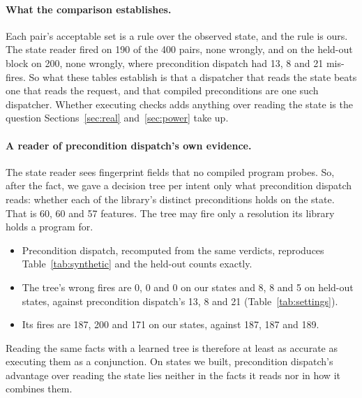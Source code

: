 \documentclass[11pt]{article}
\begin{document}
\paragraph{What the comparison establishes.}
Each pair's acceptable set is a rule over the observed state, and the rule is ours. The state
reader fired on 190 of the 400 pairs, none wrongly, and on the held-out block on 200, none
wrongly, where precondition dispatch had 13, 8 and 21 mis-fires. So what these tables establish
is that a dispatcher that reads the state beats one that reads the request, and that compiled
preconditions are one such dispatcher. Whether executing checks adds anything over reading the
state is the question Sections~\ref{sec:real} and~\ref{sec:power} take up.

\paragraph{A reader of precondition dispatch's own evidence.}
The state reader sees fingerprint fields that no compiled program probes. So, after the fact, we
gave a decision tree per intent only what precondition dispatch reads: whether each of the
library's distinct preconditions holds on the state. That is 60, 60 and 57 features. The tree may
fire only a resolution its library holds a program for.
\begin{itemize}
  \item Precondition dispatch, recomputed from the same verdicts, reproduces Table~\ref{tab:synthetic}
  and the held-out counts exactly.
  \item The tree's wrong fires are 0, 0 and 0 on our states and 8, 8 and 5 on held-out states,
  against precondition dispatch's 13, 8 and 21 (Table~\ref{tab:settings}).
  \item Its fires are 187, 200 and 171 on our states, against 187, 187 and 189.
\end{itemize}
Reading the same facts with a learned tree is therefore at least as accurate as executing them as
a conjunction. On states we built, precondition dispatch's advantage over reading the state lies
neither in the facts it reads nor in how it combines them.
\end{document}
